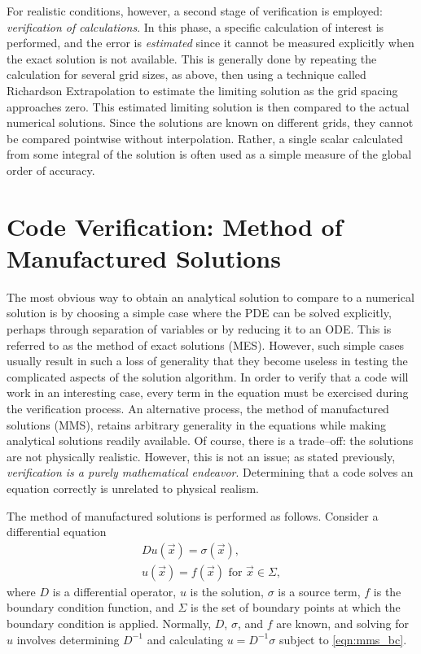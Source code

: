 For realistic conditions, however, a second stage of verification is employed: \textit{verification of calculations}.
In this phase, a specific calculation of interest is performed, and the error is \textit{estimated} since it cannot be measured explicitly when the exact solution is not available.
This is generally done by repeating the calculation for several grid sizes, as above, then using a technique called Richardson Extrapolation to estimate the limiting solution as the grid spacing approaches zero.
This estimated limiting solution is then compared to the actual numerical solutions.
Since the solutions are known on different grids, they cannot be compared pointwise without interpolation.
Rather, a single scalar calculated from some integral of the solution is often used as a simple measure of the global order of accuracy. %

\section{Code Verification: Method of Manufactured Solutions}

The most obvious way to obtain an analytical solution to compare to a numerical solution is by choosing a simple case where the PDE can be solved explicitly, perhaps through separation of variables or by reducing it to an ODE.
This is referred to as the method of exact solutions (MES).
However, such simple cases usually result in such a loss of generality that they become useless in testing the complicated aspects of the solution algorithm.
In order to verify that a code will work in an interesting case, every term in the equation must be exercised during the verification process.
An alternative process, the method of manufactured solutions (MMS), retains arbitrary generality in the equations while making analytical solutions readily available.
Of course, there is a trade--off: the solutions are not physically realistic.
However, this is not an issue; as stated previously, \textit{verification is a purely mathematical endeavor}.
Determining that a code solves an equation correctly is unrelated to physical realism.

The method of manufactured solutions is performed as follows.
Consider a differential equation
\begin{align}
  Du(\vec{x}) = \sigma(\vec{x}), \label{eqn:mms_de} \\
  u(\vec{x})=f(\vec{x}) \mbox{ for } \vec{x} \in \Sigma,
  \label{eqn:mms_bc}
\end{align}
where $D$ is a differential operator, $u$ is the solution, $\sigma$ is a source term, $f$ is the boundary condition function, and $\Sigma$ is the set of boundary points at which the boundary condition is applied.
Normally, $D$, $\sigma$, and $f$ are known, and solving for $u$ involves determining $D^{-1}$ and calculating $u = D^{-1}\sigma$ subject to \eqref{eqn:mms_bc}.


